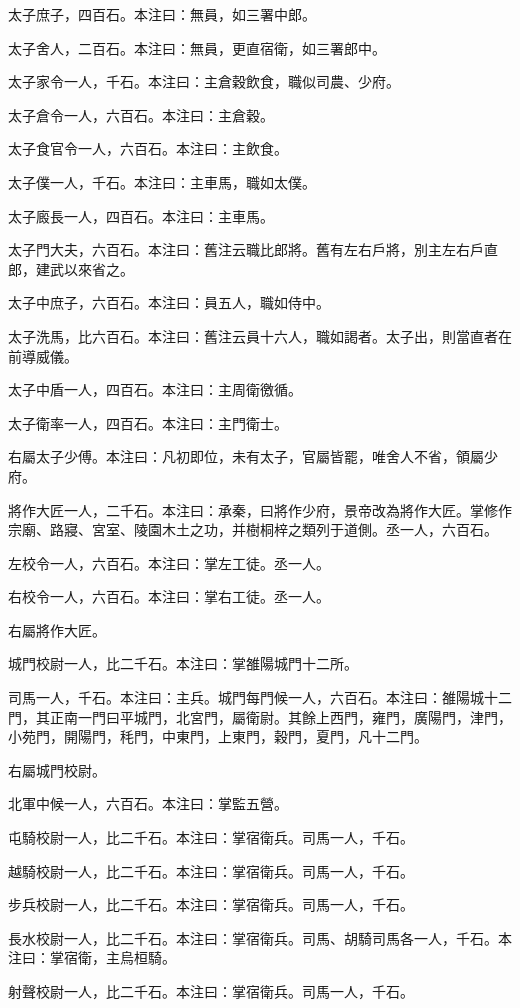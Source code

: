 \begin{pinyinscope}
太子庶子，四百石。本注曰：無員，如三署中郎。

太子舍人，二百石。本注曰：無員，更直宿衛，如三署郎中。

太子家令一人，千石。本注曰：主倉穀飲食，職似司農、少府。

太子倉令一人，六百石。本注曰：主倉穀。

太子食官令一人，六百石。本注曰：主飲食。

太子僕一人，千石。本注曰：主車馬，職如太僕。

太子廄長一人，四百石。本注曰：主車馬。

太子門大夫，六百石。本注曰：舊注云職比郎將。舊有左右戶將，別主左右戶直郎，建武以來省之。

太子中庶子，六百石。本注曰：員五人，職如侍中。

太子洗馬，比六百石。本注曰：舊注云員十六人，職如謁者。太子出，則當直者在前導威儀。

太子中盾一人，四百石。本注曰：主周衛徼循。

太子衛率一人，四百石。本注曰：主門衛士。

右屬太子少傅。本注曰：凡初即位，未有太子，官屬皆罷，唯舍人不省，領屬少府。

將作大匠一人，二千石。本注曰：承秦，曰將作少府，景帝改為將作大匠。掌修作宗廟、路寢、宮室、陵園木土之功，并樹桐梓之類列于道側。丞一人，六百石。

左校令一人，六百石。本注曰：掌左工徒。丞一人。

右校令一人，六百石。本注曰：掌右工徒。丞一人。

右屬將作大匠。

城門校尉一人，比二千石。本注曰：掌雒陽城門十二所。

司馬一人，千石。本注曰：主兵。城門每門候一人，六百石。本注曰：雒陽城十二門，其正南一門曰平城門，北宮門，屬衛尉。其餘上西門，雍門，廣陽門，津門，小苑門，開陽門，秏門，中東門，上東門，穀門，夏門，凡十二門。

右屬城門校尉。

北軍中候一人，六百石。本注曰：掌監五營。

屯騎校尉一人，比二千石。本注曰：掌宿衛兵。司馬一人，千石。

越騎校尉一人，比二千石。本注曰：掌宿衛兵。司馬一人，千石。

步兵校尉一人，比二千石。本注曰：掌宿衛兵。司馬一人，千石。

長水校尉一人，比二千石。本注曰：掌宿衛兵。司馬、胡騎司馬各一人，千石。本注曰：掌宿衛，主烏桓騎。

射聲校尉一人，比二千石。本注曰：掌宿衛兵。司馬一人，千石。


\end{pinyinscope}

